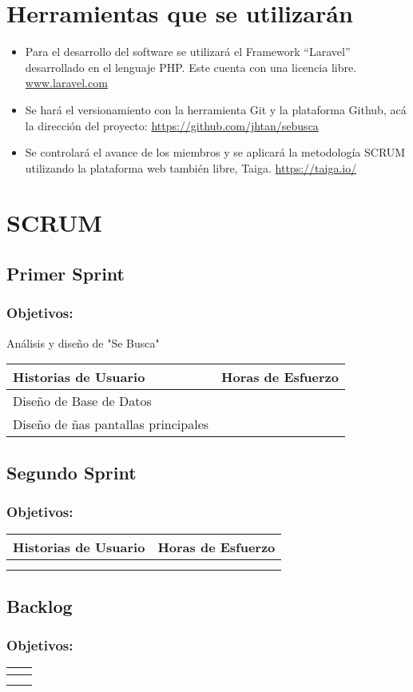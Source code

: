 \documentclass[letterpaper]{article}
\begin{document}
\section{Herramientas que se utilizarán}
\begin{itemize}
\item Para el desarrollo del software se utilizará el Framework “Laravel” desarrollado en el lenguaje PHP. Este cuenta con una licencia libre. \\ \url{www.laravel.com}
\item Se hará el versionamiento con la herramienta Git y la plataforma Github, acá la dirección del proyecto:
\url{https://github.com/jhtan/sebusca}
\item Se controlará el avance de los miembros y se aplicará la metodología SCRUM utilizando la plataforma web también libre, Taiga.
\url{https://taiga.io/}
\end{itemize}
\section{SCRUM}
\subsection{Primer Sprint}
\subsubsection*{Objetivos:}
Análisis y diseño de "Se Busca"
\begin{table}[h!]
\centering
\begin{tabular}{|l|c|} \hline
\textbf{Historias de Usuario}& \textbf{Horas de Esfuerzo} \\\hline
Diseño de Base de Datos &  \\\hline
Diseño de ñas pantallas principales &  \\\hline
\end{tabular}
\end{table}
\subsection{Segundo Sprint}
\subsubsection*{Objetivos: }
\begin{table}[h!]
\centering
\begin{tabular}{|c|c|} \hline
\textbf{Historias de Usuario}& \textbf{Horas de Esfuerzo} \\\hline
 &  \\\hline
 &  \\\hline
\end{tabular}
\end{table}
\subsection{Backlog}
\subsubsection*{Objetivos:}
\begin{table}[h!]
\centering
\begin{tabular}{|c|c|} \hline
\textbf{ }& \textbf{ } \\\hline
 &  \\
 \hline
 &  \\\hline
\end{tabular}
\end{table}
\end{document}
